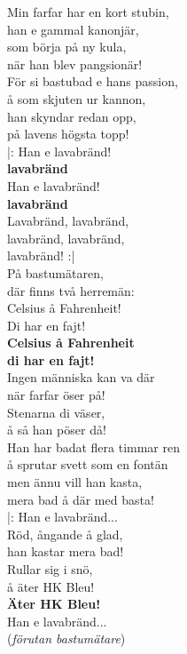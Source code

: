\documentclass[12pt]{article}
\begin{document}
\noindent
\begin{minipage}{0.4\textwidth}
	\noindent
	Min farfar har en kort stubin,\\
	han e gammal kanonjär,\\
	som börja på ny kula,\\
	när han blev pangsionär!\\
	För si bastubad e hans passion,\\
	å som skjuten ur kannon,\\
	han skyndar redan opp,\\
	på lavens högsta topp!\\
	
	\noindent
	|: Han e lavabränd!\\
	\textbf{\small{lavabränd}}\\
	Han e lavabränd!\\
	\textbf{\small{lavabränd}}\\
	Lavabränd, lavabränd,\\
	lavabränd, lavabränd,\\
	lavabränd! :|\\
	På bastumätaren,\\
	där finns två herremän:\\
	Celsius å Fahrenheit!\\
	Di har en fajt!\\
	\textbf{\small{Celsius å Fahrenheit\\
	di har en fajt!}}\\
	
	\noindent
	Ingen människa kan va där\\
	när farfar öser på!\\
	Stenarna di väser,\\
	å så han pöser då!\\
	Han har badat flera timmar ren\\
	å sprutar svett som en fontän\\
	men ännu vill han kasta,\\
	mera bad å där med basta!\\
	
	|: Han e lavabränd...\\
	
	\noindent
	Röd, ångande å glad,\\
	han kastar mera bad!\\
	Rullar sig i snö,\\
	å äter HK Bleu!\\
	\textbf{\small{Äter HK Bleu!}}\\
	
	Han e lavabränd...\\(\textit{förutan bastumätare})
	
\end{minipage}
\end{document}
